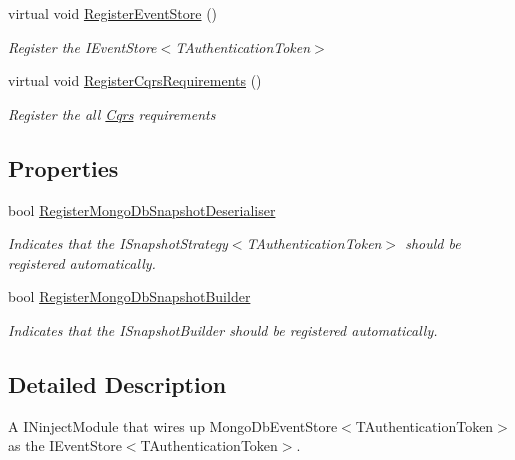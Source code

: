 \begin{DoxyCompactItemize}
virtual void \hyperlink{classCqrs_1_1Ninject_1_1MongoDB_1_1Configuration_1_1MongoDbEventStoreModule_af3d4df6ddd6ec25467bced1a07eae300_af3d4df6ddd6ec25467bced1a07eae300}{Register\+Event\+Store} ()
\begin{DoxyCompactList}\small\item\em Register the I\+Event\+Store$<$\+T\+Authentication\+Token$>$ \end{DoxyCompactList}\item 
virtual void \hyperlink{classCqrs_1_1Ninject_1_1MongoDB_1_1Configuration_1_1MongoDbEventStoreModule_aec046bc34e4aaf11a0cae5ebb2bb6db1_aec046bc34e4aaf11a0cae5ebb2bb6db1}{Register\+Cqrs\+Requirements} ()
\begin{DoxyCompactList}\small\item\em Register the all \hyperlink{namespaceCqrs}{Cqrs} requirements \end{DoxyCompactList}\end{DoxyCompactItemize}
\subsection*{Properties}
\begin{DoxyCompactItemize}
\item 
bool \hyperlink{classCqrs_1_1Ninject_1_1MongoDB_1_1Configuration_1_1MongoDbEventStoreModule_a66cc337cdacc9f6bee967c03c2ab9cef_a66cc337cdacc9f6bee967c03c2ab9cef}{Register\+Mongo\+Db\+Snapshot\+Deserialiser}
\begin{DoxyCompactList}\small\item\em Indicates that the I\+Snapshot\+Strategy$<$\+T\+Authentication\+Token$>$ should be registered automatically. \end{DoxyCompactList}\item 
bool \hyperlink{classCqrs_1_1Ninject_1_1MongoDB_1_1Configuration_1_1MongoDbEventStoreModule_ad117a2cf21b462dade1055b4f15516bf_ad117a2cf21b462dade1055b4f15516bf}{Register\+Mongo\+Db\+Snapshot\+Builder}
\begin{DoxyCompactList}\small\item\em Indicates that the I\+Snapshot\+Builder should be registered automatically. \end{DoxyCompactList}\end{DoxyCompactItemize}


\subsection{Detailed Description}
A I\+Ninject\+Module that wires up Mongo\+Db\+Event\+Store$<$\+T\+Authentication\+Token$>$ as the I\+Event\+Store$<$\+T\+Authentication\+Token$>$. 


